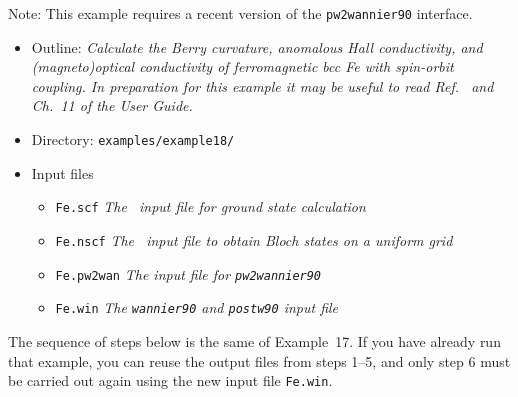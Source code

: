 \documentclass[a4paper,11pt,twoside]{article}
\begin{document}


Note: This example requires a recent version of the {\tt pw2wannier90} interface.

\begin{itemize}
\item{Outline: \it{Calculate the Berry curvature, anomalous Hall
      conductivity, and (magneto)optical conductivity of ferromagnetic
      bcc Fe with spin-orbit coupling. In preparation for this example
      it may be useful to read Ref.~\cite{yao-prl04} and Ch.~11 of the
      User Guide.}}
\item{Directory: {\tt examples/example18/}}
\item{Input files}
\begin{itemize}
\item{ {\tt Fe.scf} {\it The \pwscf\ input file for ground state
    calculation}}
\item{ {\tt Fe.nscf}  {\it The \pwscf\ input file to obtain Bloch
    states on a uniform grid}} 
\item{ {\tt Fe.pw2wan}  {\it The input file for {\tt pw2wannier90}}}
\item{ {\tt Fe.win}  {\it The {\tt wannier90} and {\tt postw90} input file}}
\end{itemize}
\end{itemize}

The sequence of steps below is the same of Example~17.  If you have
already run that example, you can reuse the output files from steps
1--5, and only step 6 must be carried out again using the new input
file {\tt Fe.win}.
\end{document}
